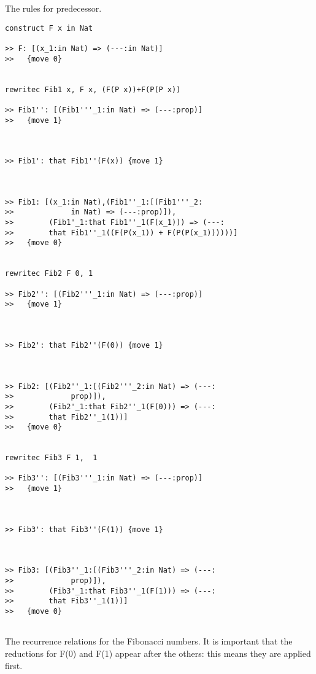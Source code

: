 \documentclass{article}
\begin{document}
The rules for predecessor.

\begin{verbatim}
construct F x in Nat

>> F: [(x_1:in Nat) => (---:in Nat)]
>>   {move 0}


rewritec Fib1 x, F x, (F(P x))+F(P(P x))

>> Fib1'': [(Fib1'''_1:in Nat) => (---:prop)]
>>   {move 1}



>> Fib1': that Fib1''(F(x)) {move 1}



>> Fib1: [(x_1:in Nat),(Fib1''_1:[(Fib1'''_2:
>>             in Nat) => (---:prop)]),
>>        (Fib1'_1:that Fib1''_1(F(x_1))) => (---:
>>        that Fib1''_1((F(P(x_1)) + F(P(P(x_1))))))]
>>   {move 0}


rewritec Fib2 F 0, 1

>> Fib2'': [(Fib2'''_1:in Nat) => (---:prop)]
>>   {move 1}



>> Fib2': that Fib2''(F(0)) {move 1}



>> Fib2: [(Fib2''_1:[(Fib2'''_2:in Nat) => (---:
>>             prop)]),
>>        (Fib2'_1:that Fib2''_1(F(0))) => (---:
>>        that Fib2''_1(1))]
>>   {move 0}


rewritec Fib3 F 1,  1

>> Fib3'': [(Fib3'''_1:in Nat) => (---:prop)]
>>   {move 1}



>> Fib3': that Fib3''(F(1)) {move 1}



>> Fib3: [(Fib3''_1:[(Fib3'''_2:in Nat) => (---:
>>             prop)]),
>>        (Fib3'_1:that Fib3''_1(F(1))) => (---:
>>        that Fib3''_1(1))]
>>   {move 0}


\end{verbatim}

The recurrence relations for the Fibonacci numbers.  It is important that the reductions for F(0) and F(1) appear after the others:  this means
they are applied first.
\end{document}
